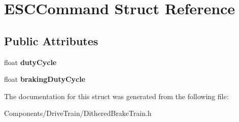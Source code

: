 \hypertarget{struct_e_s_c_command}{
\section{\-E\-S\-C\-Command \-Struct \-Reference}
\label{struct_e_s_c_command}
}
\subsection*{\-Public \-Attributes}
\begin{DoxyCompactItemize}
\item 
\hypertarget{struct_e_s_c_command_a6c461b13a064cfa3f582d5136b955634}{
float {\bfseries duty\-Cycle}}
\label{struct_e_s_c_command_a6c461b13a064cfa3f582d5136b955634}

\item 
\hypertarget{struct_e_s_c_command_a0533839994274f959bbdd662f0c8b017}{
float {\bfseries braking\-Duty\-Cycle}}
\label{struct_e_s_c_command_a0533839994274f959bbdd662f0c8b017}

\end{DoxyCompactItemize}


\-The documentation for this struct was generated from the following file\-:\begin{DoxyCompactItemize}
\item 
\-Components/\-Drive\-Train/\-Dithered\-Brake\-Train.\-h\end{DoxyCompactItemize}
